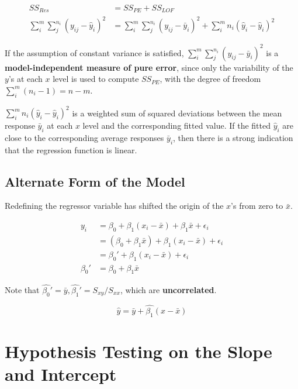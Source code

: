 \documentclass[12pt]{article}
\begin{document}
$$
\begin{aligned}
SS_{Res} &= SS_{PE} + SS_{LOF} \\[8pt]
\sum_i^m \sum_j^{n_i} (y_{ij} - \hat{y}_i)^2 &= \sum_i^m \sum_j^{n_i} (y_{ij} - \bar{y}_i)^2 + \sum_i^m n_i (\hat{y}_i - \hat{y}_i)^2
\end{aligned}
$$

If the assumption of constant variance is satisfied, $\sum_i^m \sum_j^{n_i} (y_{ij} - \bar{y}_i)^2$ is a \textbf{model-independent measure of pure error}, since only the variability of the $y$'s at each $x$ level is used to compute $SS_{PE}$, with the degree of freedom $\sum_i^m (n_i - 1) = n - m$.

$\sum_i^m n_i (\hat{y}_i - \hat{y}_i)^2$ is a weighted sum of squared deviations between the mean response $\bar{y}_i$ at each $x$ level and the corresponding fitted value. If the fitted $\hat{y}_i$ are close to the corresponding average responses $\bar{y}_i$, then there is a strong indication that the regression function is linear.

\subsection{Alternate Form of the Model}

Redefining the regressor variable has shifted the origin of the $x$'s from zero to $\bar{x}$.

$$
\begin{aligned}
y_i &= \beta_0 + \beta_1 (x_i - \bar{x}) + \beta_1 \bar{x} + \epsilon_i \\
&= (\beta_0 + \beta_1 \bar{x}) + \beta_1 (x_i - \bar{x}) + \epsilon_i \\
&= \beta_0' + \beta_1 (x_i - \bar{x}) + \epsilon_i \\[10pt]
\beta_0' &= \beta_0 + \beta_1 \bar{x}
\end{aligned}
$$

Note that $\hat{\beta_0}' = \bar{y}, \hat{\beta_1}' = S_{xy}/S_{xx}$, which are \textbf{uncorrelated}.

$$
\hat{y} = \bar{y} + \hat{\beta_1} ( x - \bar{x})
$$

\pagebreak

\section{Hypothesis Testing on the Slope and Intercept}
\end{document}
